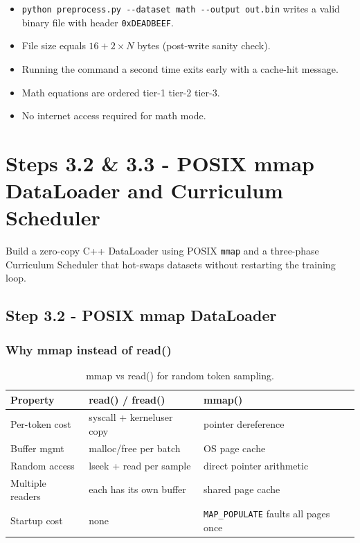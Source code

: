 \documentclass[12pt, a4paper]{article}
\begin{document}
\begin{tcolorbox}[exitbox, title={Step 3.1 - Exit Criterion (met)}]
  \begin{itemize}
    \item \texttt{python preprocess.py -{}-dataset math -{}-output out.bin} writes a
          valid binary file with header \texttt{0xDEADBEEF}. \checkmark
    \item File size equals $16 + 2 \times N$ bytes (post-write sanity check). \checkmark
    \item Running the command a second time exits early with a cache-hit message. \checkmark
    \item Math equations are ordered tier-1  tier-2  tier-3. \checkmark
    \item No internet access required for math mode. \checkmark
  \end{itemize}
\end{tcolorbox}

\section{Steps 3.2 \& 3.3 - POSIX mmap DataLoader and Curriculum Scheduler}

\begin{tcolorbox}[designbox, title={Steps 3.2 \& 3.3 Goal}]
  Build a zero-copy C++ DataLoader using POSIX \texttt{mmap} and a
  three-phase Curriculum Scheduler that hot-swaps datasets without
  restarting the training loop.
\end{tcolorbox}

\subsection{Step 3.2 - POSIX mmap DataLoader}

\subsubsection{Why mmap instead of read()}

\begin{table}[!ht]
\centering
\renewcommand{\arraystretch}{1.3}
\begin{tabularx}{\textwidth}{@{} l L L @{}}
\toprule
\textbf{Property} & \textbf{read() / fread()} & \textbf{mmap()} \\
\midrule
Per-token cost   & syscall + kerneluser copy & pointer dereference \\
Buffer mgmt      & malloc/free per batch & OS page cache \\
Random access    & lseek + read per sample & direct pointer arithmetic \\
Multiple readers & each has its own buffer & shared page cache \\
Startup cost     & none & \texttt{MAP\_POPULATE} faults all pages once \\
\bottomrule
\end{tabularx}
\caption{mmap vs read() for random token sampling.}
\end{table}
\end{document}

